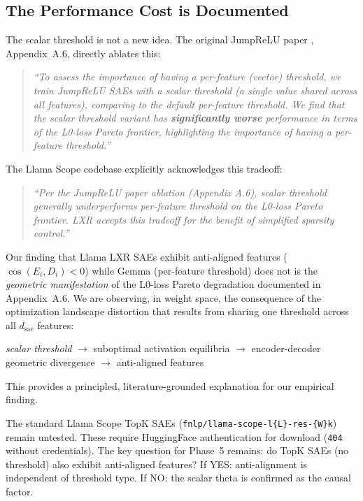 \documentclass[11pt,a4paper]{article}
\newcommand{\cosED}{\cos(E_i, D_i)}
\begin{document}
\subsection{The Performance Cost is Documented}

The scalar threshold is not a new idea. The original JumpReLU paper \citep{rajamanoharan2024}, Appendix~A.6, directly ablates this:
\begin{quote}
\emph{``To assess the importance of having a per-feature (vector) threshold, we train JumpReLU SAEs with a scalar threshold (a single value shared across all features), comparing to the default per-feature threshold. We find that the scalar threshold variant has \textbf{significantly worse} performance in terms of the L0-loss Pareto frontier, highlighting the importance of having a per-feature threshold.''}
\end{quote}

The Llama Scope codebase explicitly acknowledges this tradeoff:
\begin{quote}
\emph{``Per the JumpReLU paper ablation (Appendix A.6), scalar threshold generally underperforms per-feature threshold on the L0-loss Pareto frontier. LXR accepts this tradeoff for the benefit of simplified sparsity control.''}
\end{quote}

\begin{architecturebox}
Our finding that Llama LXR SAEs exhibit anti-aligned features (\mbox{$\cosED < 0$}) while Gemma (per-feature threshold) does not is the \emph{geometric manifestation} of the L0-loss Pareto degradation documented in Appendix~A.6. We are observing, in weight space, the consequence of the optimization landscape distortion that results from sharing one threshold across all $d_\text{sae}$ features:

\begin{center}
\emph{scalar threshold} $\to$ suboptimal activation equilibria $\to$ encoder-decoder geometric divergence $\to$ anti-aligned features
\end{center}

This provides a principled, literature-grounded explanation for our empirical finding.
\end{architecturebox}

\begin{limitation}
The standard Llama Scope TopK SAEs (\texttt{fnlp/llama-scope-l\{L\}-res-\{W\}k}) remain untested. These require HuggingFace authentication for download (\texttt{404} without credentials). The key question for Phase~5 remains: do TopK SAEs (no threshold) also exhibit anti-aligned features? If YES: anti-alignment is independent of threshold type. If NO: the scalar theta is confirmed as the causal factor.
\end{limitation}
\end{document}
